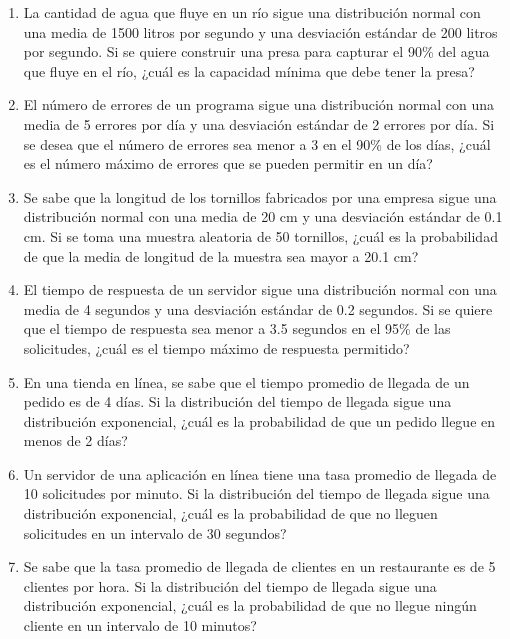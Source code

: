 \begin{Ejer}
\begin{enumerate}
    \item La cantidad de agua que fluye en un río sigue una distribución normal con una media de 1500 litros por segundo y una desviación estándar de 200 litros por segundo. Si se quiere construir una presa para capturar el 90\% del agua que fluye en el río, ¿cuál es la capacidad mínima que debe tener la presa?

    \item El número de errores de un programa sigue una distribución normal con una media de 5 errores por día y una desviación estándar de 2 errores por día. Si se desea que el número de errores sea menor a 3 en el 90\% de los días, ¿cuál es el número máximo de errores que se pueden permitir en un día?

    \item Se sabe que la longitud de los tornillos fabricados por una empresa sigue una distribución normal con una media de 20 cm y una desviación estándar de 0.1 cm. Si se toma una muestra aleatoria de 50 tornillos, ¿cuál es la probabilidad de que la media de longitud de la muestra sea mayor a 20.1 cm?

    \item El tiempo de respuesta de un servidor sigue una distribución normal con una media de 4 segundos y una desviación estándar de 0.2 segundos. Si se quiere que el tiempo de respuesta sea menor a 3.5 segundos en el 95\% de las solicitudes, ¿cuál es el tiempo máximo de respuesta permitido?

    \item En una tienda en línea, se sabe que el tiempo promedio de llegada de un pedido es de 4 días. Si la distribución del tiempo de llegada sigue una distribución exponencial, ¿cuál es la probabilidad de que un pedido llegue en menos de 2 días?

    \item Un servidor de una aplicación en línea tiene una tasa promedio de llegada de 10 solicitudes por minuto. Si la distribución del tiempo de llegada sigue una distribución exponencial, ¿cuál es la probabilidad de que no lleguen solicitudes en un intervalo de 30 segundos?

    \item Se sabe que la tasa promedio de llegada de clientes en un restaurante es de 5 clientes por hora. Si la distribución del tiempo de llegada sigue una distribución exponencial, ¿cuál es la probabilidad de que no llegue ningún cliente en un intervalo de 10 minutos?

\end{enumerate}
\end{Ejer} 


